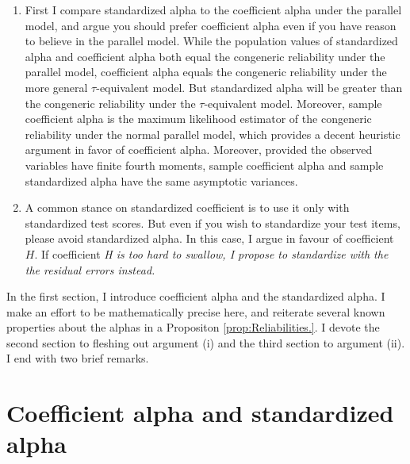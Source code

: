 \documentclass{article}
\theoremstyle{plain}
\theoremstyle{plain}
\theoremstyle{definition}
\theoremstyle{remark}
\theoremstyle{definition}
\theoremstyle{plain}
\theoremstyle{plain}
\theoremstyle{definition}
\begin{document}
\begin{enumerate}[label=\arabic*.]
\item First I compare standardized alpha to the coefficient alpha under the parallel model, and argue you should prefer coefficient alpha even if you have reason to believe in the parallel model. While the population values of standardized alpha and coefficient alpha both equal the congeneric reliability under the parallel model, coefficient alpha equals the congeneric reliability under the more general $\tau$-equivalent model. But standardized alpha will be greater than the congeneric reliability under the $\tau$-equivalent model. Moreover, sample coefficient alpha is the maximum likelihood estimator of the congeneric reliability under the normal parallel model, which provides a decent heuristic argument in favor of coefficient alpha. Moreover, provided the observed variables have finite fourth moments, sample coefficient alpha and sample standardized alpha have the same asymptotic variances. 

\item A common stance on standardized coefficient is to use it only with standardized test scores. But even if you wish to standardize your test items, please avoid standardized alpha.  In this case, I argue in favour of coefficient $H$. If coefficient \it{H} is too hard to swallow, I propose to standardize with the the residual errors instead.
\end{enumerate}

In the first section, I introduce coefficient alpha and the standardized alpha. I make an effort to be mathematically precise here, and reiterate several known properties about the alphas in a Propositon \ref{prop:Reliabilities.}. I devote the second section to fleshing out argument (i) and the third section to argument (ii). I end with two brief remarks.
\section{Coefficient alpha and standardized alpha}
\end{document}
